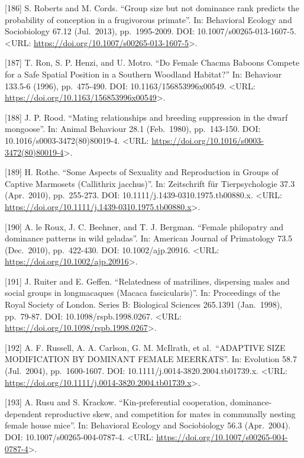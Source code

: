 \documentclass[
]{article}
\begin{document}
{[}186{]} S. Roberts and M. Cords. ``Group size but not dominance rank
predicts the probability of conception in a frugivorous primate''. In:
Behavioral Ecology and Sociobiology 67.12 (Jul.~2013), pp.~1995-2009.
DOI: 10.1007/s00265-013-1607-5. \textless URL:
\url{https://doi.org/10.1007/s00265-013-1607-5}\textgreater.

{[}187{]} T. Ron, S. P. Henzi, and U. Motro. ``Do Female Chacma Baboons
Compete for a Safe Spatial Position in a Southern Woodland Habitat?''
In: Behaviour 133.5-6 (1996), pp.~475-490. DOI: 10.1163/156853996x00549.
\textless URL:
\url{https://doi.org/10.1163/156853996x00549}\textgreater.

{[}188{]} J. P. Rood. ``Mating relationships and breeding suppression in
the dwarf mongoose''. In: Animal Behaviour 28.1 (Feb.~1980),
pp.~143-150. DOI: 10.1016/s0003-3472(80)80019-4. \textless URL:
\url{https://doi.org/10.1016/s0003-3472(80)80019-4}\textgreater.

{[}189{]} H. Rothe. ``Some Aspects of Sexuality and Reproduction in
Groups of Captive Marmosets (Callithrix jacchus)''. In: Zeitschrift für
Tierpsychologie 37.3 (Apr.~2010), pp.~255-273. DOI:
10.1111/j.1439-0310.1975.tb00880.x. \textless URL:
\url{https://doi.org/10.1111/j.1439-0310.1975.tb00880.x}\textgreater.

{[}190{]} A. le Roux, J. C. Beehner, and T. J. Bergman. ``Female
philopatry and dominance patterns in wild geladas''. In: American
Journal of Primatology 73.5 (Dec.~2010), pp.~422-430. DOI:
10.1002/ajp.20916. \textless URL:
\url{https://doi.org/10.1002/ajp.20916}\textgreater.

{[}191{]} J. Ruiter and E. Geffen. ``Relatedness of matrilines,
dispersing males and social groups in longmacaques (Macaca
fascicularis)''. In: Proceedings of the Royal Society of London. Series
B: Biological Sciences 265.1391 (Jan.~1998), pp.~79-87. DOI:
10.1098/rspb.1998.0267. \textless URL:
\url{https://doi.org/10.1098/rspb.1998.0267}\textgreater.

{[}192{]} A. F. Russell, A. A. Carlson, G. M. McIlrath, et
al.~``ADAPTIVE SIZE MODIFICATION BY DOMINANT FEMALE MEERKATS''. In:
Evolution 58.7 (Jul.~2004), pp.~1600-1607. DOI:
10.1111/j.0014-3820.2004.tb01739.x. \textless URL:
\url{https://doi.org/10.1111/j.0014-3820.2004.tb01739.x}\textgreater.

{[}193{]} A. Rusu and S. Krackow. ``Kin-preferential cooperation,
dominance-dependent reproductive skew, and competition for mates in
communally nesting female house mice''. In: Behavioral Ecology and
Sociobiology 56.3 (Apr.~2004). DOI: 10.1007/s00265-004-0787-4.
\textless URL:
\url{https://doi.org/10.1007/s00265-004-0787-4}\textgreater.
\end{document}
